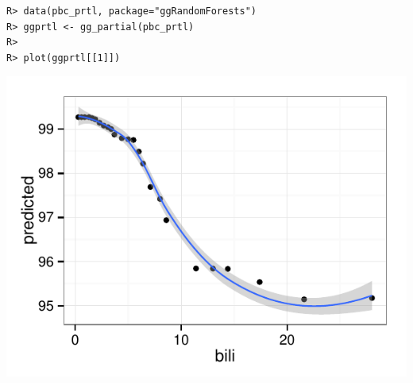 \documentclass[nojss]{jss}\usepackage[]{graphicx}\usepackage[]{color}
\makeatletter
\def\maxwidth{ %
  \ifdim\Gin@nat@width>\linewidth
    \linewidth
  \else
    \Gin@nat@width
  \fi
}
\newenvironment{kframe}{%
 \def\at@end@of@kframe{}%
 \ifinner\ifhmode%
  \def\at@end@of@kframe{\end{minipage}}%
  \begin{minipage}{\columnwidth}%
 \fi\fi%
 \def\FrameCommand##1{\hskip\@totalleftmargin \hskip-\fboxsep
 \colorbox{shadecolor}{##1}\hskip-\fboxsep
     \hskip-\linewidth \hskip-\@totalleftmargin \hskip\columnwidth}%
 \MakeFramed {\advance\hsize-\width
   \@totalleftmargin\z@ \linewidth\hsize
   \@setminipage}}%
 {\par\unskip\endMakeFramed%
 \at@end@of@kframe}
\newenvironment{knitrout}{}{} %
\makeatother
\begin{document}
\begin{knitrout}\footnotesize
{}\color{fgcolor}\begin{kframe}
\begin{verbatim}
R> data(pbc_prtl, package="ggRandomForests")
R> ggprtl <- gg_partial(pbc_prtl)
R> 
R> plot(ggprtl[[1]])
\end{verbatim}
\end{kframe}

{\centering \includegraphics[width=\maxwidth]{figure/vig-pbc-partial-bili-1} 

}



\end{knitrout}
\end{document}
